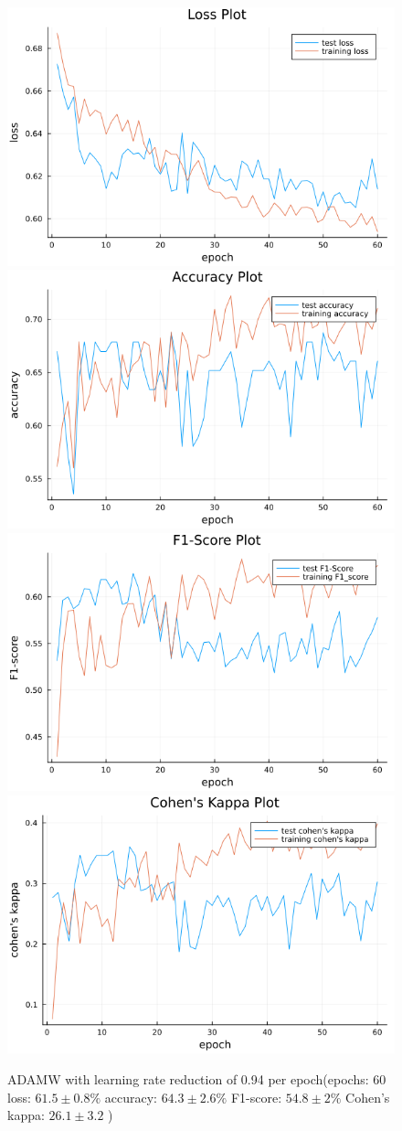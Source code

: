 \documentclass[
a4paper, 
12pt,
grayscalebody, %
abstract=on,
twoside, BCOR10mm, 12pt, DIV13,headinclude, footexclude, final, abstracton, openright
]{ibireprt}
\numberwithin{equation}{chapter}
\numberwithin{table}{chapter}
\numberwithin{figure}{chapter}
\numberwithin{algorithm}{chapter}
\numberwithin{example}{chapter}
\numberwithin{example}{chapter}
\begin{document}
\begin{figure}[h]
	\includegraphics[width=0.4\linewidth]{loss_png_11_3.png}\hfill
	\includegraphics[width=0.4\linewidth]{accuracy_png_11_3.png}
	\\[\smallskipamount]
	\includegraphics[width=0.4\linewidth]{f1_score_png_11_3.png}\hfill
	\includegraphics[width=0.4\linewidth]{cohens_kappa_png_11_3.png}
	\caption{ADAMW with learning rate reduction of 0.94 per epoch(epochs: 60 loss: $61.5\pm0.8\% $ accuracy: $64.3\pm2.6\%$ F1-score: $54.8\pm2\%$  Cohen's kappa: $26.1\pm3.2$ )}
\end{figure}%

\clearpage
\end{document}
